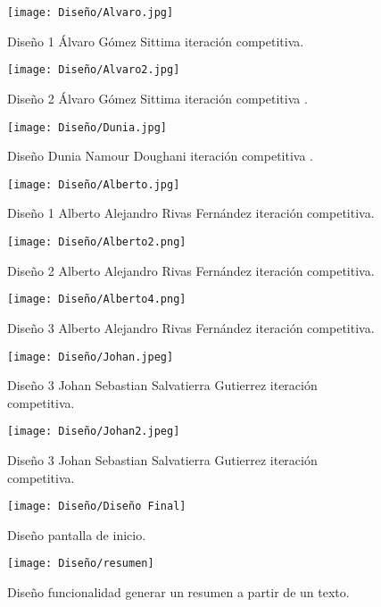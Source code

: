 \begin{figure}[ht!]
    \centering
    \texttt{[image: Diseño/Alvaro.jpg]}
    \caption{Diseño 1 Álvaro Gómez Sittima iteración competitiva.}
    \label{IteracionCompetitiva1}
\end{figure}
\begin{figure}[ht!]
    \centering
    \texttt{[image: Diseño/Alvaro2.jpg]}
    \caption{Diseño 2 Álvaro Gómez Sittima iteración competitiva .}
    \label{IteracionCompetitiva2}
\end{figure}
\begin{figure}[ht!]
    \centering
    \texttt{[image: Diseño/Dunia.jpg]}
    \caption{Diseño Dunia Namour Doughani iteración competitiva .}
    \label{IteracionCompetitiva3}
\end{figure}
\begin{figure}[ht!]
    \centering
    \texttt{[image: Diseño/Alberto.jpg]}
    \caption{Diseño 1 Alberto Alejandro Rivas Fernández iteración competitiva.}
    \label{IteracionCompetitiva4}
\end{figure}
\begin{figure}[ht!]
  \centering
  \texttt{[image: Diseño/Alberto2.png]}
  \caption{Diseño 2 Alberto Alejandro Rivas Fernández iteración competitiva.}
  \label{IteracionCompetitivaA2}
\end{figure}
\begin{figure}[ht!]
  \centering
  \texttt{[image: Diseño/Alberto4.png]}
  \caption{Diseño 3 Alberto Alejandro Rivas Fernández iteración competitiva.}
  \label{IteracionCompetitivaA3}
\end{figure}
\begin{figure}[ht!]
  \centering
  \texttt{[image: Diseño/Johan.jpeg]}
  \caption{Diseño 3 Johan Sebastian Salvatierra Gutierrez iteración competitiva.}
  \label{IteracionCompetitivaJ1}
\end{figure}
\begin{figure}[ht!]
  \centering
  \texttt{[image: Diseño/Johan2.jpeg]}
  \caption{Diseño 3 Johan Sebastian Salvatierra Gutierrez iteración competitiva.}
  \label{IteracionCompetitivaJ2}
\end{figure}
\begin{figure}[ht!]
  \centering
  \texttt{[image: Diseño/Diseño Final]}
  \caption{Diseño pantalla de inicio.}
  \label{diseño_final}
\end{figure}
\begin{figure}[ht!]
  \centering
  \texttt{[image: Diseño/resumen]}
  \caption{Diseño funcionalidad generar un resumen a partir de un texto.}
  \label{resuemn}
\end{figure}
